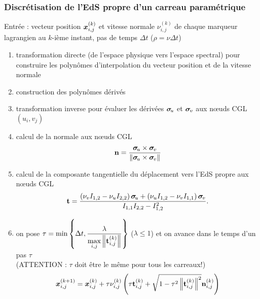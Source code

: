 \subsubsection{Discrétisation de l'EdS propre d'un carreau paramétrique}
\label{section:discretisation_EdS_propre_carreau}
Entrée : vecteur position $\bm{x}_{i,j}^{(k)}$ et vitesse normale $\nu_{i,j}^{(k)}$ de chaque marqueur lagrangien au $k$-ième instant, pas de temps $\Delta t$ (\ie $\rho = \nu \Delta t$)
\begin{enumerate}
	\item transformation directe (de l'espace physique vers l'espace spectral) pour construire les polynômes d'interpolation du vecteur position et de la vitesse normale
	\item construction des polynômes dérivés 
	\item transformation inverse pour évaluer les dérivées $\bm{\sigma}_{\mkern-3muu}$ et $\bm{\sigma}_{\mkern-2muv}$ aux n\oe uds CGL $(u_i,v_j)$
	\item calcul de la normale aux n\oe uds CGL
	\begin{equation}
		\mathbf{n} = \frac{{\bm{\sigma}_{\mkern-3muu}} \times {\bm{\sigma}_{\mkern-2muv}}}{\left\| {{\bm{\sigma}_{\mkern-3muu}} \times {\bm{\sigma}_{\mkern-2muv}}} \right\|}
	\end{equation}
	\item calcul de la composante tangentielle du déplacement vers l'EdS propre aux n\oe uds CGL
	\begin{equation}
		\mathbf{t} = \frac{
				\left( \nu_v I_{1,2} - \nu_u I_{2,2} \right) \bm{\sigma}_{\mkern-3muu} + 
				\left( \nu_u I_{1,2} - \nu_v I_{1,1} \right) \bm{\sigma}_{\mkern-2muv}
			}{
				I_{1,1} I_{2,2} - I_{1,2}^2
			}.
	\end{equation}
	\item on pose $\tau = \min\left\{\Delta t, \displaystyle\frac{\lambda}{\displaystyle\max_{i,j} \left\| {\mathbf{t}_{i,j}^{(k)} } \right\|} \right\}$ ($\lambda \leq 1$) et on avance dans le temps d'un pas $\tau$\\(ATTENTION : $\tau$ doit être le même pour tous les carreaux!)
	\begin{equation}
		\bm{x}_{i,j}^{(k+1)} = \bm{x}_{i,j}^{(k)} + \tau \nu_{i,j}^{(k)} 
		\left( 
			\tau \mathbf{t}_{i,j}^{(k)} + \sqrt{1 - \tau^2 \left\| {\mathbf{t}_{i,j}^{(k)}} \right\|^2} \mathbf{n}_{i,j}^{(k)}
		\right)
	\end{equation}
	

\end{enumerate}
